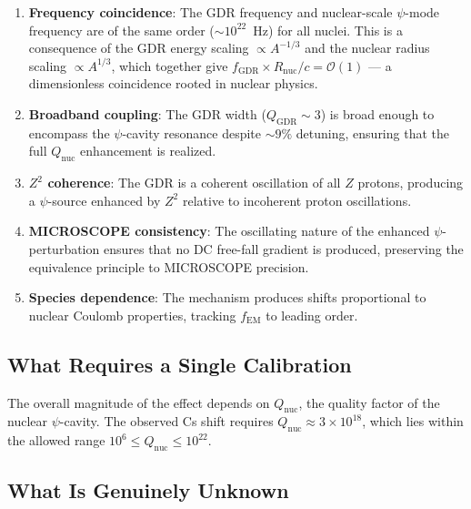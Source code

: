 \documentclass[aps,prd,twocolumn,superscriptaddress,nofootinbib]{revtex4-2}
\newcommand{\order}[1]{\mathcal{O}(#1)}
\newcommand{\ee}[1]{\times 10^{#1}}
\newcommand{\fEM}{f_{\mathrm{EM}}}
\newcommand{\Qnuc}{Q_{\mathrm{nuc}}}
\newcommand{\Rnuc}{R_{\mathrm{nuc}}}
\newcommand{\fGDR}{f_{\mathrm{GDR}}}
\begin{document}
\begin{enumerate}[nosep]
\item \textbf{Frequency coincidence}: The GDR frequency and
nuclear-scale $\psi$-mode frequency are of the same order
($\sim\!10^{22}$~Hz) for all nuclei.  This is a consequence of the
GDR energy scaling $\propto A^{-1/3}$ and the nuclear radius scaling
$\propto A^{1/3}$, which together give $\fGDR \times \Rnuc/c =
\order{1}$ --- a dimensionless coincidence rooted in nuclear physics.

\item \textbf{Broadband coupling}: The GDR width ($Q_{\mathrm{GDR}}
\sim 3$) is broad enough to encompass the $\psi$-cavity resonance
despite $\sim\!9\%$ detuning, ensuring that the full $\Qnuc$
enhancement is realized.

\item \textbf{$Z^2$ coherence}: The GDR is a coherent oscillation
of all $Z$ protons, producing a $\psi$-source enhanced by $Z^2$
relative to incoherent proton oscillations.

\item \textbf{MICROSCOPE consistency}: The oscillating nature of the
enhanced $\psi$-perturbation ensures that no DC free-fall gradient is
produced, preserving the equivalence principle to MICROSCOPE precision.

\item \textbf{Species dependence}: The mechanism produces shifts
proportional to nuclear Coulomb properties, tracking $\fEM$ to
leading order.
\end{enumerate}

\subsection{What Requires a Single Calibration}

The overall magnitude of the effect depends on $\Qnuc$, the quality
factor of the nuclear $\psi$-cavity.  The observed Cs shift requires
$\Qnuc \approx 3\ee{18}$, which lies within the allowed range
$10^6 \leq \Qnuc \leq 10^{22}$.

\subsection{What Is Genuinely Unknown}
\end{document}
